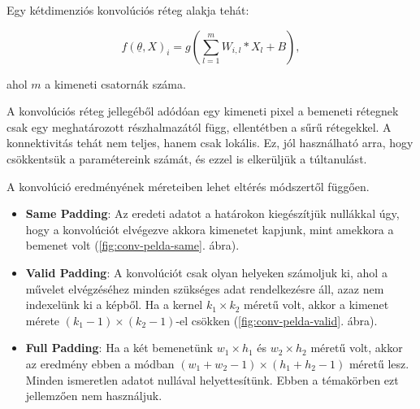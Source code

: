 \noindent
Egy kétdimenziós konvolúciós réteg alakja tehát:


\[ f(\underline{\theta}, X)_i = g( \sum_{l=1}^m W_{i, l} \ast X_l + B) , \]



\noindent
ahol $ m $ a kimeneti csatornák száma. 

A konvolúciós réteg jellegéből adódóan egy kimeneti pixel a bemeneti rétegnek csak egy meghatározott részhalmazától függ, ellentétben a sűrű rétegekkel. A konnektivitás tehát nem teljes, hanem csak lokális. Ez, jól használható arra, hogy csökkentsük a paramétereink számát, és ezzel is elkerüljük a túltanulást.



A konvolúció eredményének méreteiben lehet eltérés módszertől függően. 

\begin{itemize}
	\item 
	\textbf{Same Padding}: Az eredeti adatot a határokon kiegészítjük nullákkal úgy, hogy a konvolúciót elvégezve akkora kimenetet kapjunk, mint amekkora a bemenet volt (\ref{fig:conv-pelda-same}. ábra).
	
	\item 
	\textbf{Valid Padding}: A konvolúciót csak olyan helyeken számoljuk ki, ahol a művelet elvégzéséhez minden szükséges adat rendelkezésre áll, azaz nem indexelünk ki a képből. Ha a kernel $ k_1 \times k_2 $ méretű volt, akkor a kimenet mérete $ (k_1-1) \times (k_2-1) $-el csökken (\ref{fig:conv-pelda-valid}. ábra).
	
	\item 
	\textbf{Full Padding}: Ha a két bemenetünk $ w_1 \times h_1 $ és $ w_2 \times h_2 $ méretű volt, akkor az eredmény ebben a módban $ (w_1 + w_2 - 1) \times (h_1 + h_2 - 1) $ méretű lesz. Minden ismeretlen adatot nullával helyettesítünk. Ebben a témakörben ezt jellemzően nem használjuk.
	
\end{itemize}


